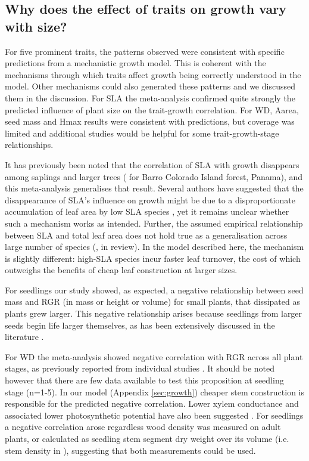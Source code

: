\documentclass[a4paper,11pt]{article}
\begin{document}
\subsection*{Why does the effect of traits on growth vary with size?}

For five prominent traits, the patterns observed were consistent with specific predictions from a mechanistic growth model. This is coherent with the mechanisms through which traits affect growth being correctly understood in the model. Other mechanisms could also generated these patterns and we discussed them in the discussion. For SLA the meta-analysis confirmed quite strongly the predicted influence of plant size on the trait-growth correlation. For WD, Aarea, seed mass and Hmax results were consistent with predictions, but coverage was limited and additional studies would be helpful for some trait-growth-stage relationships. 

It has previously been noted that the correlation of SLA with growth disappears among saplings and larger trees (\citealt{Wright:2010tp} for Barro Colorado Island forest, Panama), and this meta-analysis generalises that result. Several authors have suggested that the disappearance of SLA's influence on growth might be due to a disproportionate accumulation of leaf area by low SLA species \citep{Reich:1992wm,Poorter:2008iu,Wright:2010tp}, yet it remains unclear whether such a mechanism works as intended. Further, the assumed empirical relationship between SLA and total leaf area does not hold true as a generalisation across large number of species (\citeauthor{Duursma-2015}, in review). In the model described here, the mechanism is slightly different: high-SLA species incur faster leaf turnover, the cost of which outweighs the benefits of cheap leaf construction at larger sizes.

For seedlings our study showed, as expected, a negative relationship between seed mass and RGR (in mass or height or volume) for small plants, that dissipated as plants grew larger. This negative relationship arises because seedlings from larger seeds begin life larger themselves, as has been extensively discussed in the literature \citep[reviewed by][]{Turnbull:2012ew}. 

For WD the meta-analysis showed negative correlation with RGR across all plant stages, as previously reported from individual studies \citep{Wright:2010tp,Ruger:2012jv}. It should be noted however that there are few data available to test this proposition at seedling stage (n=1-5). In our model (Appendix \ref{sec:growth}) cheaper stem construction is responsible for the predicted negative correlation. Lower xylem conductance and associated lower photosynthetic potential have also been suggested \citep[reviewed by][]{Chave:2009iy}.
For seedlings a negative correlation arose regardless wood density was measured on adult plants, or calculated as seedling stem segment dry weight over its volume (i.e. stem density in  \citealt{CastroDiez:1998gz}), suggesting that both measurements could be used.
\end{document}
